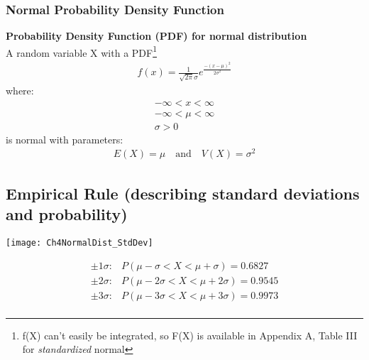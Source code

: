 \documentclass[../INDE315.tex]{subfiles}
\begin{document}
\subsubsection*{Normal Probability Density Function}
\begin{defn}
    \textbf{Probability Density Function (PDF) for normal distribution} \\
    A random variable X with a PDF\footnote{f(X) can't easily be integrated, so F(X) is available in Appendix A, Table III for \emph{standardized} normal}
    \begin{equation*}
        \begin{aligned}
            f(x) = \frac{1}{\sqrt{2 \pi} \sigma} e^{\frac{-(x-\mu)^2}{2\sigma ^2}}
        \end{aligned}
    \end{equation*}
    where:
    \begin{equation*}
        \begin{aligned}
            -\infty < x < \infty \\
            -\infty < \mu < \infty \\ 
            \sigma > 0
        \end{aligned}
    \end{equation*}
    is normal with parameters:
    \begin{equation*}
        \begin{aligned}
            E(X) = \mu \quad \text{and} \quad V(X) = \sigma ^2 
        \end{aligned}
    \end{equation*}
\end{defn}

\subsection*{Empirical Rule (describing standard deviations and probability)}
\begin{center}
    \texttt{[image: Ch4NormalDist\_StdDev]}
\end{center}
\begin{equation*}
    \begin{aligned}
        \pm 1 \sigma :& P(\mu - \sigma < X < \mu + \sigma) = 0.6827 \\
        \pm 2 \sigma :& P(\mu - 2 \sigma < X < \mu + 2 \sigma) = 0.9545 \\
        \pm 3 \sigma :& P(\mu - 3 \sigma < X < \mu + 3 \sigma) = 0.9973 \\
    \end{aligned}
\end{equation*}
\end{document}
